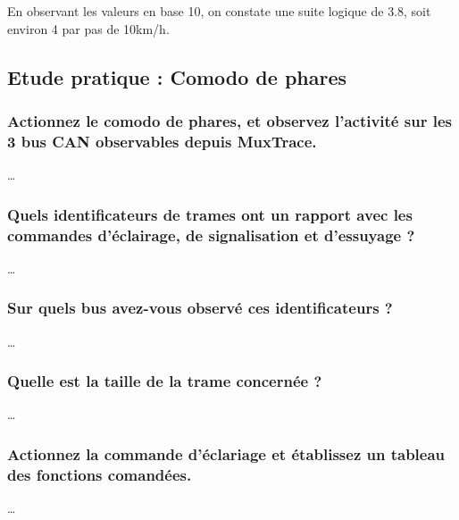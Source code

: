 \documentclass{rapportECC}
\begin{document}
En observant les valeurs en base 10, on constate une suite logique de 3.8, soit environ 4 par pas de 10km/h.

\subsection{Etude pratique : Comodo de phares}

\subsubsection*{Actionnez le comodo de phares, et observez l'activité sur les 3 bus CAN observables depuis MuxTrace.}

\dots

\subsubsection*{Quels identificateurs de trames ont un rapport avec les commandes d'éclairage, de signalisation et d'essuyage ?}

\dots

\subsubsection*{Sur quels bus avez-vous observé ces identificateurs ?}

\dots

\subsubsection*{Quelle est la taille de la trame concernée ?}

\dots

\subsubsection*{Actionnez la commande d'éclariage et établissez un tableau des fonctions comandées.}

\dots

\end{document}
